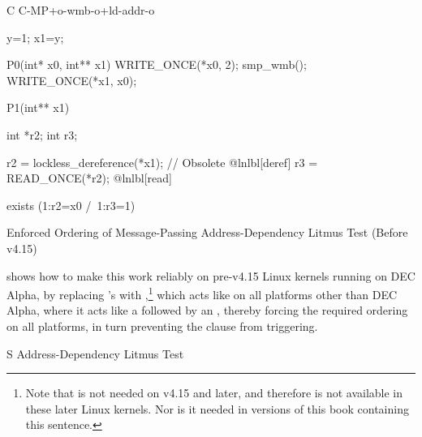 \begin{listing}
\begin{fcvlabel}
\begin{VerbatimL}[commandchars=\@\[\]]
C C-MP+o-wmb-o+ld-addr-o

{
y=1;
x1=y;
}

P0(int* x0, int** x1) {
	WRITE_ONCE(*x0, 2);
	smp_wmb();
	WRITE_ONCE(*x1, x0);
}

P1(int** x1) {
	int *r2;
	int r3;

	r2 = lockless_dereference(*x1); // Obsolete @lnlbl[deref]
	r3 = READ_ONCE(*r2);			    @lnlbl[read]
}

exists (1:r2=x0 /\ 1:r3=1)
\end{VerbatimL}
\end{fcvlabel}
\caption{Enforced Ordering of Message-Passing Address-Dependency Litmus Test (Before v4.15)}
\label{lst:memorder:Enforced Ordering of Message-Passing Address-Dependency Litmus Test (Before v4.15)}
\end{listing}

\begin{fcvref}
shows how to make this work reliably on pre-v4.15 Linux kernels running on
DEC Alpha, by replacing 's  with
,\footnote{
	Note that  is not needed on v4.15 and
	later, and therefore is not available in these later Linux kernels.
	Nor is it needed in versions of this book containing this sentence.}
which acts like  on all platforms other than DEC Alpha,
where it acts like a  followed by an ,
thereby forcing the required ordering on all platforms, in turn
preventing the  clause from triggering.
\end{fcvref}

\begin{listing}

\caption{S Address-Dependency Litmus Test}
\label{lst:memorder:S Address-Dependency Litmus Test}
\end{listing}

